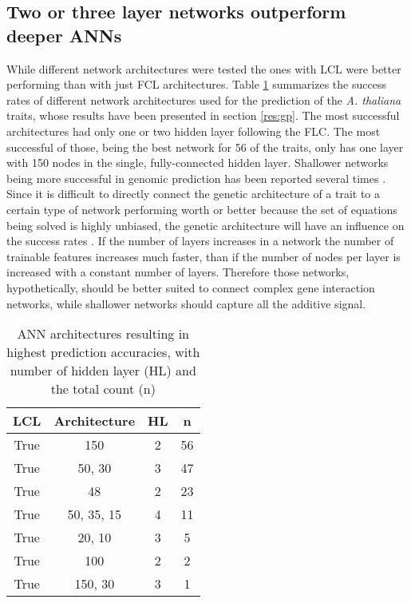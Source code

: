 \subsection{Two or three layer networks outperform deeper ANNs}

While different network architectures were tested the ones with LCL were better performing
than with just FCL architectures. Table \ref{tab:ann_res} summarizes the success rates of
different network architectures used for the prediction of the \textit{A. thaliana}
traits, whose results have been presented in section \ref{res:gp}. The most successful
architectures had only one or two hidden layer following the FLC. The most successful of
those, being the best network for 56 of the traits, only has one layer with 150 nodes in
the single, fully-connected hidden layer. Shallower networks being more successful
in genomic prediction has been reported several times \cite{azodi2019}.\\
Since it is difficult to directly connect the genetic architecture of a trait to a certain
type of network performing worth or better because the set of equations being solved is
highly unbiased, the genetic architecture will have an influence on the success rates
\cite{gianola2013}. If the number of layers increases in a network the number of trainable
features increases much faster, than if the number of nodes per layer is increased with a
constant number of layers. Therefore those networks, hypothetically, should be better
suited to connect complex gene interaction networks, while shallower networks should
capture all the additive signal.

\onehalfspacing
\begin{table}[H]
 \centering
 \caption[ANN architectures of ANN resulting in highest prediction accuracies]{ANN
   architectures resulting in highest prediction accuracies, with number of hidden layer
   (HL) and the total count (n)}
 \begin{tabular}{cccc}
   \toprule
   LCL  & Architecture & HL & n  \\ 
   \midrule
   True & 150          & 2  & 56 \\ 
   True & 50, 30       & 3  & 47 \\ 
   True & 48           & 2  & 23 \\ 
   True & 50, 35, 15   & 4  & 11 \\ 
   True & 20, 10       & 3  & 5  \\ 
   True & 100          & 2  & 2  \\ 
   True & 150, 30      & 3  & 1  \\
   \bottomrule
 \end{tabular}
 \label{tab:ann_res}
\end{table}
\doublespacing

